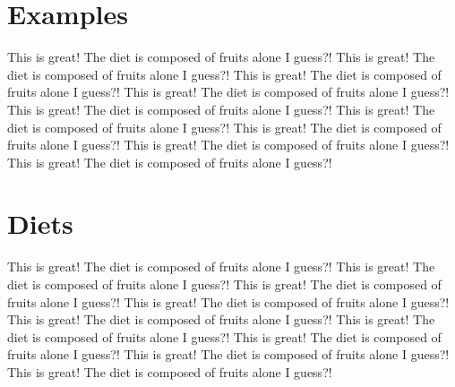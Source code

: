 \section{Examples}

This is great! The diet is composed of fruits alone I guess?! This is great! The diet is composed of fruits alone I guess?! This is great! The diet is composed of fruits alone I guess?! This is great! The diet is composed of fruits alone I guess?! This is great! The diet is composed of fruits alone I guess?! This is great! The diet is composed of fruits alone I guess?! This is great! The diet is composed of fruits alone I guess?! This is great! The diet is composed of fruits alone I guess?! This is great! The diet is composed of fruits alone I guess?! 

\section{Diets}

This is great! The diet is composed of fruits alone I guess?! This is great! The diet is composed of fruits alone I guess?! This is great! The diet is composed of fruits alone I guess?! This is great! The diet is composed of fruits alone I guess?! This is great! The diet is composed of fruits alone I guess?! This is great! The diet is composed of fruits alone I guess?! This is great! The diet is composed of fruits alone I guess?! This is great! The diet is composed of fruits alone I guess?! This is great! The diet is composed of fruits alone I guess?! 